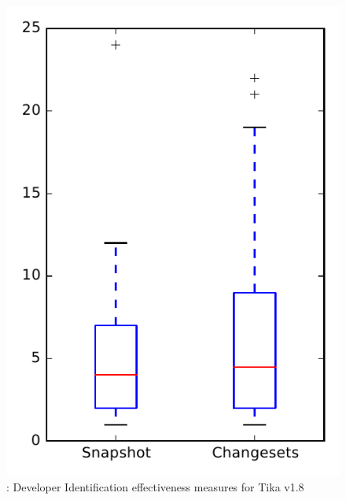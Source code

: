 
\begin{figure}
\centering
\includegraphics[height=0.4\textheight]{figures/dit/rq1_tika}
\caption{\done: Developer Identification effectiveness measures for Tika v1.8}
\label{fig:dit:rq1:tika}
\end{figure}
